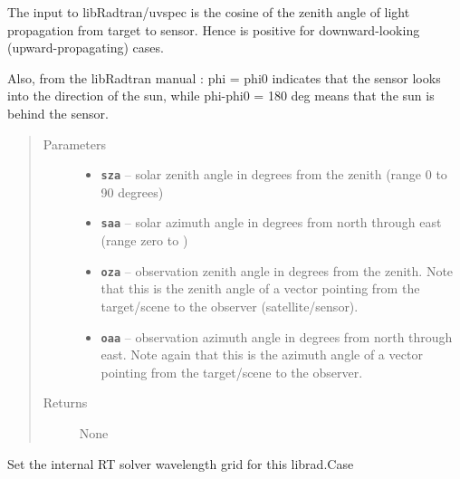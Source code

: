 \documentclass[a4paper,10pt,english]{sphinxmanual}
\begin{document}
\begin{fulllineitems}
\begin{fulllineitems}
The  input to libRadtran/uvspec is the cosine of the zenith angle of light propagation
from target to sensor. Hence  is positive for downward-looking (upward-propagating) cases.

Also, from the libRadtran manual :
phi = phi0 indicates that the sensor looks into the direction of the sun, while
phi-phi0 = 180 deg means that the sun is behind the sensor.
\begin{quote}\begin{description}
\item[{Parameters}] \leavevmode\begin{itemize}
\item {} 
\textbf{\texttt{sza}} -- solar zenith angle in degrees from the zenith (range 0 to 90 degrees)

\item {} 
\textbf{\texttt{saa}} -- solar azimuth angle in degrees from north through east (range zero to )

\item {} 
\textbf{\texttt{oza}} -- observation zenith angle in degrees from the zenith. Note that this is the zenith angle
of a vector pointing from the target/scene to the observer (satellite/sensor).

\item {} 
\textbf{\texttt{oaa}} -- observation azimuth angle in degrees from north through east. Note again that this is the
azimuth angle of a vector pointing from the target/scene to the observer.

\end{itemize}

\item[{Returns}] \leavevmode
None

\end{description}\end{quote}

\end{fulllineitems}


\begin{fulllineitems}
\label{packages:librad.Case.set_wavelength_grid}
Set the internal RT solver wavelength grid for this librad.Case


\end{fulllineitems}
\end{fulllineitems}
\end{document}
